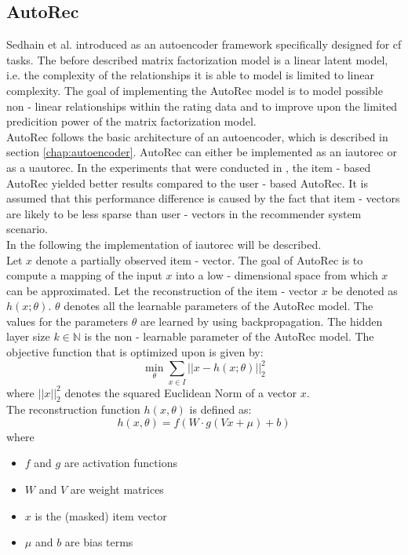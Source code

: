 \subsection{AutoRec}
Sedhain et al. \cite{sedhain2015autorec} introduced as an autoencoder framework specifically designed for \acrshort{cf} tasks.
The before described matrix factorization model is a linear latent model, i.e. the complexity of the relationships it is able to model is limited to linear complexity. The goal of implementing the AutoRec model is to model possible non - linear relationships within the rating data and to improve upon the limited predicition power of the matrix factorization model.\\
AutoRec follows the basic architecture of an autoencoder, which is described in section \ref{chap:autoencoder}. AutoRec can either be implemented as an \acrfull{iautorec} or as a \acrfull{uautorec}. In the experiments that were conducted in \cite{sedhain2015autorec}, the item - based AutoRec yielded better results compared to the user - based AutoRec. It is assumed that this performance difference is caused by the fact that item - vectors are likely to be less sparse than user - vectors in the recommender system scenario.\\
In the following the implementation of \acrshort{iautorec} will be described.\\
Let $x$ denote a partially observed item - vector. The goal of AutoRec is to compute a mapping of the input $x$ into a low - dimensional space from which $x$ can be approximated. Let the reconstruction of the item - vector $x$ be denoted as $h(x;\theta)$. $\theta$ denotes all the learnable parameters of the AutoRec model. The values for the parameters $\theta$ are learned by using backpropagation. The hidden layer size $k \in \mathbb{N}$ is the non - learnable parameter of the AutoRec model. The objective function that is optimized upon is given by:
\begin{equation}
    \min_{\theta}\sum_{x \in I} ||x - h(x; \theta)||^{2}_{2}
\end{equation}
where $||x||_{2}^{2}$ denotes the squared Euclidean Norm of a vector $x$.\\
The reconstruction function $h(x, \theta)$ is defined as:\\
\begin{equation}
    h(x,\theta) = f(W \cdot g(Vx + \mu) + b)
\end{equation}
where\\
\begin{itemize}
    \item $f$ and $g$ are activation functions
    \item $W$ and $V$ are weight matrices
    \item $x$ is the (masked) item vector
    \item $\mu$ and $b$ are bias terms
\end{itemize}
